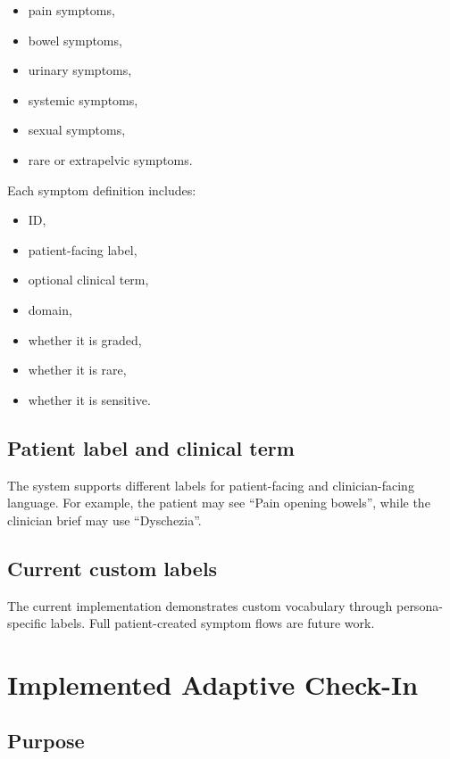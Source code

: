 \documentclass[11pt,a4paper]{article}
\begin{document}
\begin{itemize}
  \item pain symptoms,
  \item bowel symptoms,
  \item urinary symptoms,
  \item systemic symptoms,
  \item sexual symptoms,
  \item rare or extrapelvic symptoms.
\end{itemize}

Each symptom definition includes:

\begin{itemize}
  \item ID,
  \item patient-facing label,
  \item optional clinical term,
  \item domain,
  \item whether it is graded,
  \item whether it is rare,
  \item whether it is sensitive.
\end{itemize}

\subsection{Patient label and clinical term}

The system supports different labels for patient-facing and clinician-facing language. For example, the patient may see ``Pain opening bowels'', while the clinician brief may use ``Dyschezia''.

\subsection{Current custom labels}

The current implementation demonstrates custom vocabulary through persona-specific labels. Full patient-created symptom flows are future work.

\section{Implemented Adaptive Check-In}

\subsection{Purpose}
\end{document}
